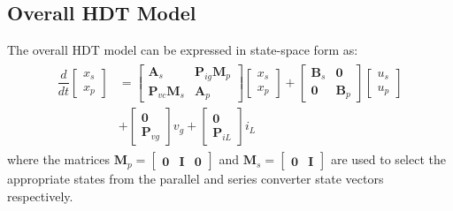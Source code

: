\subsection{Overall HDT Model}
The overall HDT model can be expressed in state-space form as:
\begin{align}
    \begin{aligned}
        \dfrac{d}{dt}
        \begin{bmatrix}
            x_s\\
            x_p
        \end{bmatrix}
        &=
        \begin{bmatrix}
            \mathbf{A}_s & \mathbf{P}_{ig}\mathbf{M}_p \\
            \mathbf{P}_{vc}\mathbf{M}_s & \mathbf{A}_p
        \end{bmatrix}
        \begin{bmatrix}
            x_s\\
            x_p
        \end{bmatrix}
        +
        \begin{bmatrix}
            \mathbf{B}_s & \mathbf{0} \\
            \mathbf{0} & \mathbf{B}_p
        \end{bmatrix}
        \begin{bmatrix}
            u_s\\
            u_p 
        \end{bmatrix}
        \\
        &+
        \begin{bmatrix}
            \mathbf{0}\\
            \mathbf{P}_{vg}
        \end{bmatrix}
        v_g
        +
        \begin{bmatrix}
            \mathbf{0}\\
            \mathbf{P}_{iL}
        \end{bmatrix}
        i_L
    \end{aligned}
\end{align}
where the matrices $\mathbf{M}_p = \begin{bmatrix}\mathbf{0} & \mathbf{I} & \mathbf{0}\end{bmatrix}$ and $\mathbf{M}_s = \begin{bmatrix}\mathbf{0} & \mathbf{I}\end{bmatrix}$ are used to select the appropriate states from the parallel and series converter state vectors respectively.
